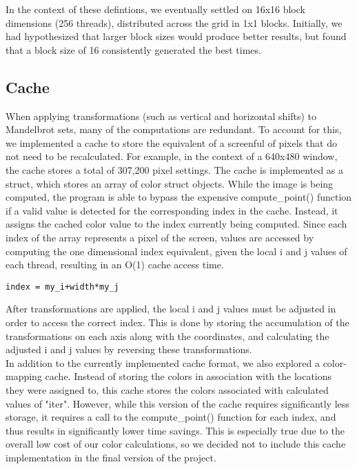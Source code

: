 \documentclass{article}
\begin{document}
In the context of these defintions, we eventually settled on 16x16 block dimensions (256 threads), distributed across the grid in 1x1 blocks. Initially, we had hypothesized that larger block sizes would produce better results, but found that a block size of 16 consistently generated the best times. 

\subsection{Cache}

When applying transformations (such as vertical and horizontal shifts) to Mandelbrot sets, many of the computations are redundant. To account for this, we implemented a cache to store the equivalent of a screenful of pixels that do not need to be recalculated. For example, in the context of a 640x480 window, the cache stores a total of 307,200 pixel settings. The cache is implemented as a struct, which stores an array of color struct objects. While the image is being computed, the program is able to bypass the expensive compute\_point() function if a valid value is detected for the corresponding index in the cache. Instead, it assigns the cached color value to the index currently being computed. Since each index of the array represents a pixel of the screen, values are accessed by computing the one dimensional index equivalent, given the local i and j values of each thread, resulting in an O(1) cache access time. 

\begin{verbatim}
index = my_i+width*my_j
\end{verbatim}

After transformations are applied, the local i and j values must be adjusted in order to access the correct index. This is done by storing the accumulation of the transformations on each axis along with the coordinates, and calculating the adjusted i and j values by reversing these transformations. \\

In addition to the currently implemented cache format, we also explored a color-mapping cache. Instead of storing the colors in association with the locations they were assigned to, this cache stores the colors associated with calculated values of "iter". However, while this version of the cache requires significantly less storage, it requires a call to the compute\_point() function for each index, and thus results in significantly lower time savings. This is especially true due to the overall low cost of our color calculations, so we decided not to include this cache implementation in the final version of the project.
\end{document}

